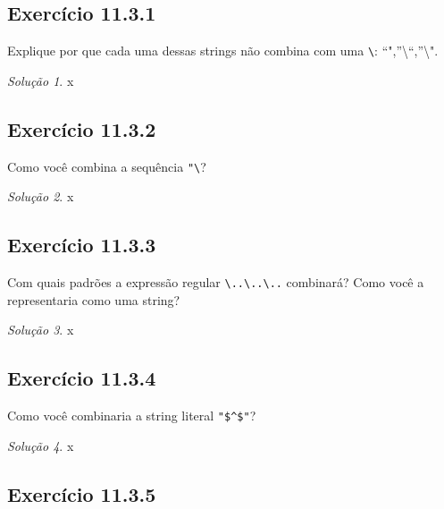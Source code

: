 \documentclass[
]{latex/krantz}
\theoremstyle{definition}
\theoremstyle{definition}
\theoremstyle{definition}
\theoremstyle{definition}
\theoremstyle{remark}
\newtheorem*{solution}{Solução}
\begin{document}
\hypertarget{exr11-3-1}{%
\subsection*{Exercício 11.3.1}\label{exr11-3-1}}

Explique por que cada uma dessas strings não combina com uma \texttt{\textbackslash{}}: ``",''\textbackslash{}``,''\textbackslash".

\begin{solution}
x
\end{solution}

\hypertarget{exr11-3-2}{%
\subsection*{Exercício 11.3.2}\label{exr11-3-2}}

Como você combina a sequência \texttt{"\textquotesingle{}\textbackslash{}}?

\begin{solution}
x
\end{solution}

\hypertarget{exr11-3-3}{%
\subsection*{Exercício 11.3.3}\label{exr11-3-3}}

Com quais padrões a expressão regular \texttt{\textbackslash{}..\textbackslash{}..\textbackslash{}..} combinará? Como você a representaria como uma string?

\begin{solution}
x
\end{solution}

\hypertarget{exr11-3-4}{%
\subsection*{Exercício 11.3.4}\label{exr11-3-4}}

Como você combinaria a string literal \texttt{"\$\^{}\$"}?

\begin{solution}
x
\end{solution}

\hypertarget{exr11-3-5}{%
\subsection*{Exercício 11.3.5}\label{exr11-3-5}}
\end{document}
